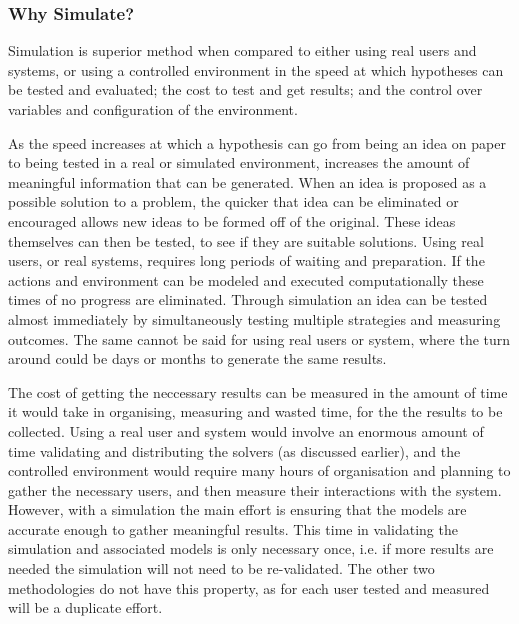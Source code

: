 \subsubsection{Why Simulate?}
Simulation is superior method when compared to either using real users and systems, or using a controlled environment in the speed at which hypotheses can be tested and evaluated;
the cost to test and get results; and the control over variables and configuration of the environment.

As the speed increases at which a hypothesis can go from being an idea on paper to being tested in a real or simulated environment, 
increases the amount of meaningful information that can be generated. 
When an idea is proposed as a possible solution to a problem, the quicker that idea can be eliminated or encouraged allows new ideas to be formed off of the original.
These ideas themselves can then be tested, to see if they are suitable solutions.
Using real users, or real systems, requires long periods of waiting and preparation.
If the actions and environment can be modeled and executed computationally these times of no progress are eliminated.
Through simulation an idea can be tested almost immediately by simultaneously testing multiple strategies and measuring outcomes.
The same cannot be said for using real users or system, where the turn around could be days or months to generate the same results.  

The cost of getting the neccessary results can be measured in the amount of time it would take in organising, measuring and wasted time, for the the results to be collected.
Using a real user and system would involve an enormous amount of time validating and distributing the solvers (as discussed earlier), 
and the controlled environment would require many hours of organisation and planning to gather the necessary users, and then measure their interactions with the system.
However, with a simulation the main effort is ensuring that the models are accurate enough to gather meaningful results.
This time in validating the simulation and associated models is only necessary once, 
i.e. if more results are needed the simulation will not need to be re-validated.
The other two methodologies do not have this property, as for each user tested and measured will be a duplicate effort. 

